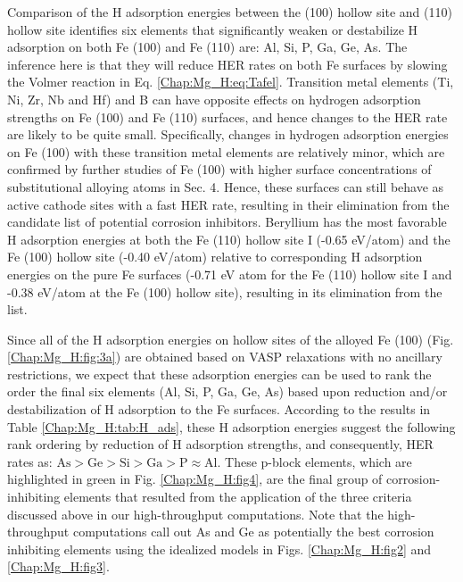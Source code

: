 Comparison of the H adsorption energies between the (100) hollow site and (110) hollow site identifies six elements that significantly weaken or destabilize H adsorption on both Fe (100) and Fe (110) are: Al, Si, P, Ga, Ge, As. The inference here is that they will reduce \ac{HER} rates on both Fe surfaces by slowing the Volmer reaction in Eq. \ref{Chap:Mg_H:eq:Tafel}. Transition metal elements (Ti, Ni, Zr, Nb and Hf) and B can have opposite effects on hydrogen adsorption strengths on Fe (100) and Fe (110) surfaces, and hence changes to the \ac{HER} rate are likely to be quite small. Specifically, changes in hydrogen adsorption energies on Fe (100) with these transition metal elements are relatively minor, which are confirmed by further studies of Fe (100) with higher surface concentrations of substitutional alloying atoms in Sec. 4. Hence, these surfaces can still behave as active cathode sites with a fast \ac{HER} rate, resulting in their elimination from the candidate list of potential corrosion inhibitors. Beryllium has the most favorable H adsorption energies at both the Fe (110) hollow site I (-0.65 eV/atom) and the Fe (100) hollow site (-0.40 eV/atom) relative to corresponding H adsorption energies on the pure Fe surfaces (-0.71 eV atom for the Fe (110) hollow site I and -0.38 eV/atom at the Fe (100) hollow site), resulting in its elimination from the list.

Since all of the H adsorption energies on hollow sites of the alloyed Fe (100) (Fig. \ref{Chap:Mg_H:fig:3a}) are obtained based on VASP relaxations with no ancillary restrictions, we expect that these adsorption energies can be used to rank the order the final six elements (Al, Si, P, Ga, Ge, As) based upon reduction and/or destabilization of H adsorption to the Fe surfaces. According to the results in Table \ref{Chap:Mg_H:tab:H_ads}, these H adsorption energies suggest the following rank ordering by reduction of H adsorption strengths, and consequently, HER rates as: $\text{As} > \text{Ge} > \text{Si} > \text{Ga} > \text{P} \approx \text{Al}$. These p-block elements, which are highlighted in green in Fig. \ref{Chap:Mg_H:fig4}, are the final group of corrosion-inhibiting elements that resulted from the application of the three criteria discussed above in our high-throughput computations. Note that the high-throughput computations call out As and Ge as potentially the best corrosion inhibiting elements using the idealized models in Figs. \ref{Chap:Mg_H:fig2} and \ref{Chap:Mg_H:fig3}. 

